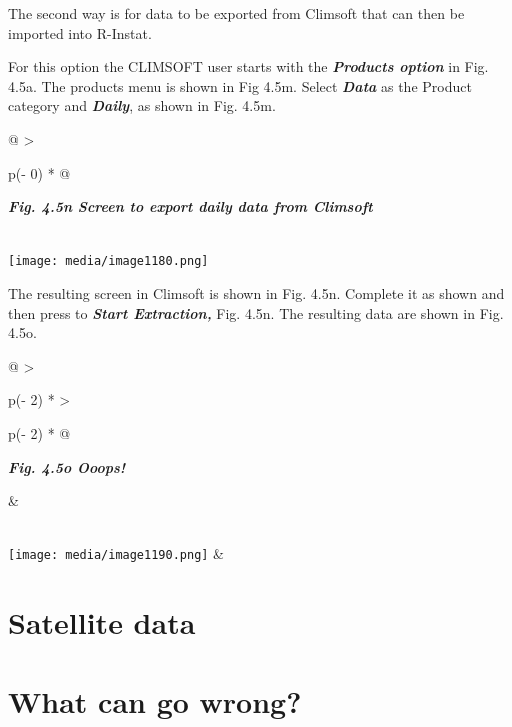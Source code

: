 \documentclass[
  letterpaper,
  DIV=11,
  numbers=noendperiod]{scrreprt}
\begin{document}
The second way is for data to be exported from Climsoft that can then be
imported into R-Instat.

For this option the CLIMSOFT user starts with the \textbf{\emph{Products
option}} in Fig. 4.5a. The products menu is shown in Fig 4.5m. Select
\textbf{\emph{Data}} as the Product category and \textbf{\emph{Daily}},
as shown in Fig. 4.5m.

\begin{longtable}[]{@{}
  >{\raggedright\arraybackslash}p{(\columnwidth - 0\tabcolsep) * }@{}}
\toprule\noalign{}
\begin{minipage}[b]{\linewidth}\raggedright
\textbf{\emph{Fig. 4.5n Screen to export daily data from Climsoft}}
\end{minipage} \\
\midrule\noalign{}
\endhead
\bottomrule\noalign{}
\endlastfoot
\texttt{[image: media/image1180.png]} \\
\end{longtable}

The resulting screen in Climsoft is shown in Fig. 4.5n. Complete it as
shown and then press to \textbf{\emph{Start Extraction,}} Fig. 4.5n. The
resulting data are shown in Fig. 4.5o.

\begin{longtable}[]{@{}
  >{\raggedright\arraybackslash}p{(\columnwidth - 2\tabcolsep) * }
  >{\raggedright\arraybackslash}p{(\columnwidth - 2\tabcolsep) * }@{}}
\toprule\noalign{}
\begin{minipage}[b]{\linewidth}\raggedright
\textbf{\emph{Fig. 4.5o Ooops!}}
\end{minipage} & \begin{minipage}[b]{\linewidth}\raggedright
\end{minipage} \\
\midrule\noalign{}
\endhead
\bottomrule\noalign{}
\endlastfoot
\texttt{[image: media/image1190.png]}
& \\
\end{longtable}

\section{Satellite data}\label{satellite-data}

\section{What can go wrong?}\label{what-can-go-wrong}
\end{document}
